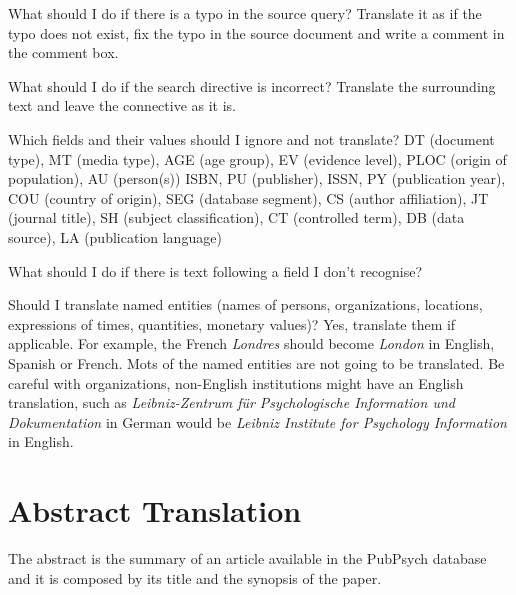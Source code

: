 \documentclass[a4paper,10pt]{article}
\newenvironment{faq}{\begin{description}[style=nextline]}{\end{description}}
\newcommand{\cris}[1]{{\color{red}{#1}}}
\begin{document}
\begin{faq}

  \item[What should I do if there is a typo in the source query?]
    Translate it as if the typo does not exist, fix the typo in the source document and write a comment in the comment box.

  \item[What should I do if the search directive is incorrect?]
    Translate the surrounding text and leave the connective as it is.
    
  \item[Which fields and their values should I ignore and not translate?]
  DT (document type), MT (media type), AGE (age group), EV (evidence level), PLOC (origin of population), AU (person(s))
  ISBN, PU (publisher), ISSN, PY (publication year), COU (country of origin), SEG (database segment), CS (author affiliation), JT (journal title), SH (subject classification), CT (controlled term), DB (data source), LA (publication language)
  
  \item[What should I do if there is text following a field I don't recognise?]
    \cris{Ignore that text?}
    
  \item[Should I translate named entities (names of persons, organizations, locations, expressions of times, quantities, monetary values)?]
    Yes, translate them if applicable. For example, the French \textit{Londres} should become \textit{London} in English, Spanish or French. Mots of the named entities are not going to be translated. Be careful with organizations, non-English institutions might have an English translation, such as \textit{Leibniz-Zentrum f\"ur Psychologische Information und Dokumentation} in German would be \textit{Leibniz Institute for Psychology Information} in English. \cris{not sure which language to choose for a French or Spanish text}
    
\end{faq}



\section{Abstract Translation}
\label{s:abstracts}


The abstract is the summary of an article available in the PubPsych database and it is composed by its title and the synopsis of the paper. 
\end{document}

